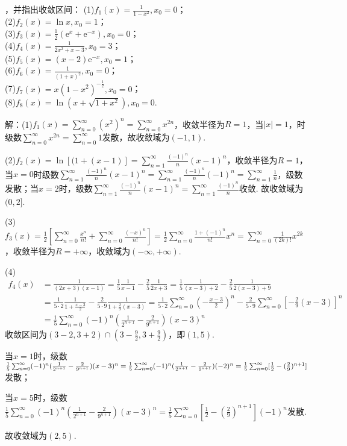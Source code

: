 \documentclass[12pt,UTF8]{ctexart}
\newcommand\Ser[1]{\sum_{n=#1}^\infty}
\begin{document}
\begin{enumerate}
，并指出收敛区间：
\newline
(1)$f_1(x)=\frac1{1-x^2},x_0=0$；\\
(2)$f_2(x)=\ln x,x_0=1$；\\
(3)$f_3(x)=\frac12(\mathrm e^x+\mathrm e^{-x}),x_0=0$；\\
(4)$f_4(x)=\frac1{2x^2+x-3},x_0=3$；\\
(5)$f_5(x)=(x-2)\mathrm e^{-x},x_0=1$；\\
(6)$f_6(x)=\frac1{(1+x)^2},x_0=0$；\\
(7)$f_7(x)=x(1-x^2)^{-\frac12},x_0=0$；\\
(8)$f_8(x)=\ln(x+\sqrt{1+x^2}),x_0=0$.

解：(1)$f_1(x)=\Ser{0}(x^2)^n=\Ser{0}x^{2n}$，收敛半径为$R=1$，当$|x|=1$，时级数$\Ser{0}x^{2n}=\Ser{0}1$发散，故收敛域为$(-1,1)$.

(2)$f_2(x)=\ln[(1+(x-1)]=\Ser{1}\frac{(-1)^n}n(x-1)^n$，收敛半径为$R=1$，当$x=0$时级数$\Ser{1}\frac{(-1)^n}n(x-1)^n=\Ser{1}\frac{(-1)^n}n(-1)^n=\Ser{1}\frac1n$，级数发散；当$x=2$时，级数$\Ser{1}\frac{(-1)^n}n(x-1)^n=\Ser{1}\frac{(-1)^n}n$收敛. 故收敛域为$(0,2]$.

(3)$f_3(x)=\frac12[\Ser{0}\frac{x^n}{n!}+\Ser{0}\frac{(-x)^n}{n!}]=\frac12\Ser{0}\frac{1+(-1)^n}{n!}x^n=\Ser{0}\frac1{(2k)!}x^{2k}$，收敛半径为$R=+\infty$，收敛域为$(-\infty,+\infty)$.

(4)\[\begin{split}
f_4(x)&=\frac1{(2x+3)(x-1)}=\frac15\frac1{x-1}-\frac25\frac1{2x+3}=\frac15\frac1{(x-3)+2}-\frac25\frac1{2(x-3)+9}\\
&=\frac1{5\cdot2}\frac1{1+\frac{x-3}2}-\frac2{5\cdot9}\frac1{1+\frac29(x-3)}=\frac1{5\cdot2}\Ser{0}(-\frac{x-3}2)^n-\frac2{5\cdot9}\Ser{0}[-\frac29(x-3)]^n\\
&=\frac15\Ser{0}(-1)^n(\frac1{2^{n+1}}-\frac2{9^{n+1}})(x-3)^n
\end{split}\]
收敛区间为$(3-2,3+2)\cap(3-\frac92,3+\frac92)$，即$(1,5)$. 

当$x=1$时，级数$\frac15\Ser{0}(-1)^n(\frac1{2^{n+1}}-\frac2{9^{n+1}})(x-3)^n=\frac15\Ser{0}(-1)^n(\frac1{2^{n+1}}-\frac2{9^{n+1}})(-2)^n\\
=\frac15\Ser{0}[\frac1{2}-(\frac29)^{n+1}]$发散；

当$x=5$时，级数$\frac15\Ser{0}(-1)^n(\frac1{2^{n+1}}-\frac2{9^{n+1}})(x-3)^n=\frac15\Ser{0}[\frac1{2}-(\frac29)^{n+1}](-1)^n$发散. 

故收敛域为$(2,5)$.


\end{enumerate}
\end{document}
